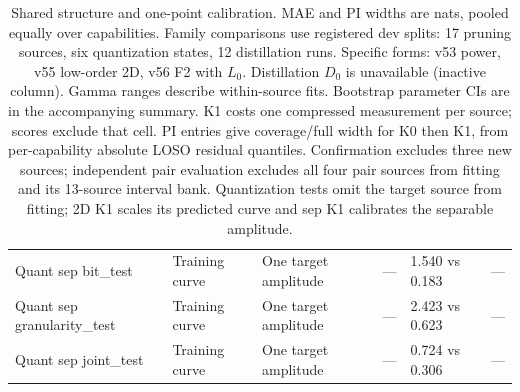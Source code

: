 \begin{table}[H]
\begin{tabular}{@{}p{1.9cm}p{1.9cm}p{2.0cm}p{2.5cm}p{2.1cm}p{2.5cm}@{}}
Quant sep bit\_test & Training curve & One target amplitude & --- & 1.540 vs 0.183 & --- \\
Quant sep granularity\_test & Training curve & One target amplitude & --- & 2.423 vs 0.623 & --- \\
Quant sep joint\_test & Training curve & One target amplitude & --- & 0.724 vs 0.306 & --- \\
\bottomrule
\end{tabular}
\caption{Shared structure and one-point calibration. MAE and PI widths are nats, pooled equally over capabilities. Family comparisons use registered dev splits: 17 pruning sources, six quantization states, 12 distillation runs. Specific forms: v53 power, v55 low-order 2D, v56 F2 with $L_0$. Distillation $D_0$ is unavailable (inactive column). Gamma ranges describe within-source fits. Bootstrap parameter CIs are in the accompanying summary. K1 costs one compressed measurement per source; scores exclude that cell. PI entries give coverage/full width for K0 then K1, from per-capability absolute LOSO residual quantiles. Confirmation excludes three new sources; independent pair evaluation excludes all four pair sources from fitting and its 13-source interval bank. Quantization tests omit the target source from fitting; 2D K1 scales its predicted curve and sep K1 calibrates the separable amplitude.}
\label{tab:shared_structure}
\end{table}
